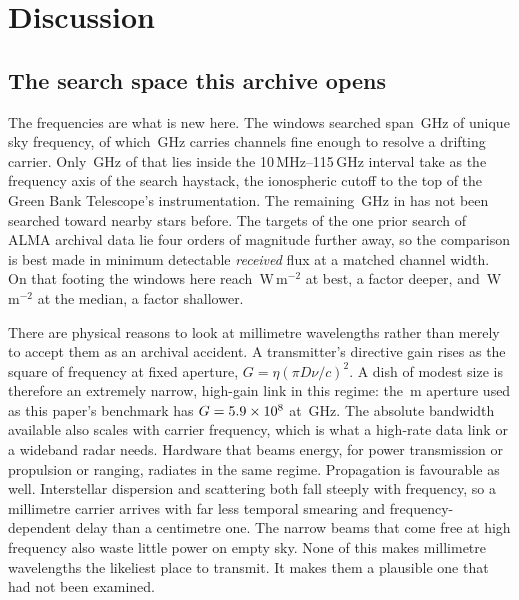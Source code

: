 \section{Discussion}
\label{sec:discussion}

\subsection{The search space this archive opens}
\label{sec:newspace}

The frequencies are what is new here. The windows searched span
\UnionGHz\,GHz of unique sky frequency, of which \DnuA\,GHz carries channels
fine enough to resolve a drifting carrier. Only \UnionBandThree\,GHz of that lies inside the 10\,MHz--115\,GHz
interval \citet{Wright2018} take as the frequency axis of the search
haystack, the ionospheric cutoff to the top of the Green Bank Telescope's
instrumentation. The remaining \UnionBandsFourEight\,GHz in
\UnionHiBandLabel{} has not been searched toward nearby stars before. The
targets of the one prior search of ALMA archival data \citep{Mason2025} lie
four orders of magnitude further away, so the comparison is best made in
minimum detectable \emph{received} flux at a matched channel width. On that
footing the windows here reach \FluxMatchBest\,W\,m$^{-2}$ at best, a
factor \FluxBestRatio{} deeper, and \FluxMatchMed\,W\,m$^{-2}$ at the
median, a factor \FluxMedRatio{} shallower.

There are physical reasons to look at millimetre wavelengths rather than
merely to accept them as an archival accident. A transmitter's directive gain rises as the square of frequency at fixed
aperture, $G=\eta(\pi D\nu/c)^{2}$. A dish of modest size is therefore an
extremely narrow, high-gain link in this regime: the \BenchDiam\,m aperture
used as this paper's benchmark has $G=5.9\times10^{8}$ at \BenchFreqGHz\,GHz.
The absolute bandwidth available also scales with carrier frequency, which
is what a high-rate data link or a wideband radar needs. Hardware that beams
energy, for power transmission or propulsion or ranging, radiates in the
same regime. Propagation is favourable as well. Interstellar dispersion and
scattering both fall steeply with frequency, so a millimetre carrier arrives
with far less temporal smearing and frequency-dependent delay than a
centimetre one. The narrow beams that come free at high frequency also waste
little power on empty sky. None of this makes millimetre
wavelengths the likeliest place to transmit. It makes them a plausible one
that had not been examined.

